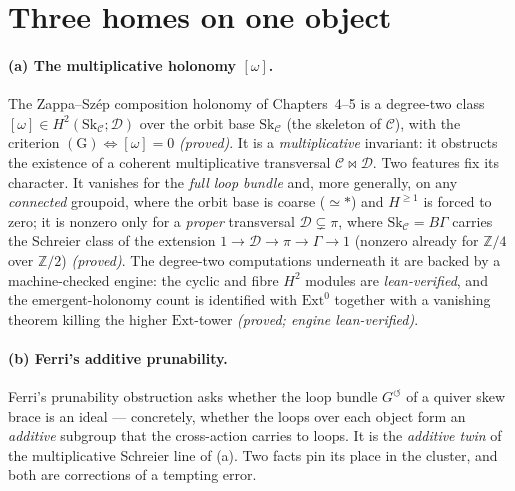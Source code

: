 \documentclass[11pt]{report}
\theoremstyle{plain}
\theoremstyle{definition}
\theoremstyle{remark}
\newcommand{\Hcoh}{H^2}
\newcommand{\Ext}{\mathrm{Ext}}
\newcommand{\Z}{\mathbb{Z}}
\begin{document}
\section{Three homes on one object}\label{sec:cluster-three}

\paragraph{(a) The multiplicative holonomy $[\omega]$.} The Zappa--Sz\'ep
composition holonomy of Chapters~4--5 is a degree-two class
$[\omega]\in\Hcoh(\mathrm{Sk}_{\mathcal C};\mathcal D)$ over the orbit base
$\mathrm{Sk}_{\mathcal C}$ (the skeleton of $\mathcal C$), with the criterion
$(\mathrm{G})\iff[\omega]=0$ \emph{(proved)}. It is a \emph{multiplicative}
invariant: it obstructs the existence of a coherent multiplicative transversal
$\mathcal C\bowtie\mathcal D$. Two features fix its character. It vanishes for the
\emph{full loop bundle} and, more generally, on any \emph{connected} groupoid,
where the orbit base is coarse ($\simeq\ast$) and $H^{\ge1}$ is forced to
zero; it is nonzero only for a \emph{proper} transversal $\mathcal D\subsetneq
\pi$, where $\mathrm{Sk}_{\mathcal C}=B\Gamma$ carries the Schreier class of the
extension $1\to\mathcal D\to\pi\to\Gamma\to1$ (nonzero already for $\Z/4$ over
$\Z/2$) \emph{(proved)}. The degree-two computations underneath it are backed by
a machine-checked engine: the cyclic and fibre $\Hcoh$ modules are
\emph{lean-verified}, and the emergent-holonomy count is identified with
$\Ext^0$ together with a vanishing theorem killing the higher $\Ext$-tower
\cite{cl-emergent} \emph{(proved; engine lean-verified)}.

\paragraph{(b) Ferri's additive prunability.} Ferri's prunability obstruction
\cite{ferri-qsb} asks whether the loop bundle $G^{\circlearrowleft}$ of a quiver
skew brace is an ideal --- concretely, whether the loops over each object form an
\emph{additive} subgroup that the cross-action carries to loops. It is the
\emph{additive twin} of the multiplicative Schreier line of (a). Two facts pin
its place in the cluster, and both are corrections of a tempting error.
\end{document}
